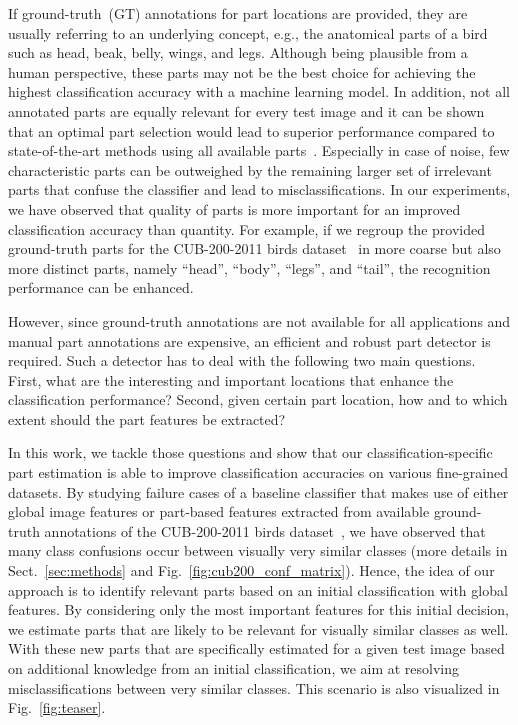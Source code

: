 \documentclass[runningheads]{llncs}
\begin{document}
If ground-truth~(GT) annotations for part locations are provided, they are usually referring to an underlying concept, e.g., the anatomical parts of a bird such as head, beak, belly, wings, and legs.
Although being plausible from a human perspective, these parts may not be the best choice for achieving the highest classification accuracy with a machine learning model.
In addition, not all annotated parts are equally relevant for every test image and it can be shown that an optimal part selection would lead to superior performance compared to state-of-the-art methods using all available parts~\cite{Korsch18:Defense}.
Especially in case of noise, few characteristic parts can be outweighed by the remaining larger set of irrelevant parts that confuse the classifier and lead to misclassifications.
In our experiments, we have observed that quality of parts is more important for an improved classification accuracy than quantity.
For example, if we regroup the provided ground-truth parts for the CUB-200-2011 birds dataset~\cite{CUB_200_2011} in more coarse but also more distinct parts, namely ``head'', ``body'', ``legs'', and ``tail'', the recognition performance can be enhanced.

However, since ground-truth annotations are not available for all applications and manual part annotations are expensive, an efficient and robust part detector is required.
Such a detector has to deal with the following two main questions.
First, what are the interesting and important locations that enhance the classification performance?
Second, given certain part location, how and to which extent should the part features be extracted?

In this work, we tackle those questions and show that our classification-specific part estimation is able to improve classification accuracies on various fine-grained datasets.
By studying failure cases of a baseline classifier that makes use of either global image features or part-based features extracted from available ground-truth annotations of the CUB-200-2011 birds dataset~\cite{CUB_200_2011}, we have observed that many class confusions occur between visually very similar classes (more details in Sect.~\ref{sec:methods} and Fig.~\ref{fig:cub200_conf_matrix}).
Hence, the idea of our approach is to identify relevant parts based on an initial classification with global features.
By considering only the most important features for this initial decision, we estimate parts that are likely to be relevant for visually similar classes as well.
With these new parts that are specifically estimated for a given test image based on additional knowledge from an initial classification, we aim at resolving misclassifications between very similar classes.
This scenario is also visualized in Fig.~\ref{fig:teaser}.
\end{document}
